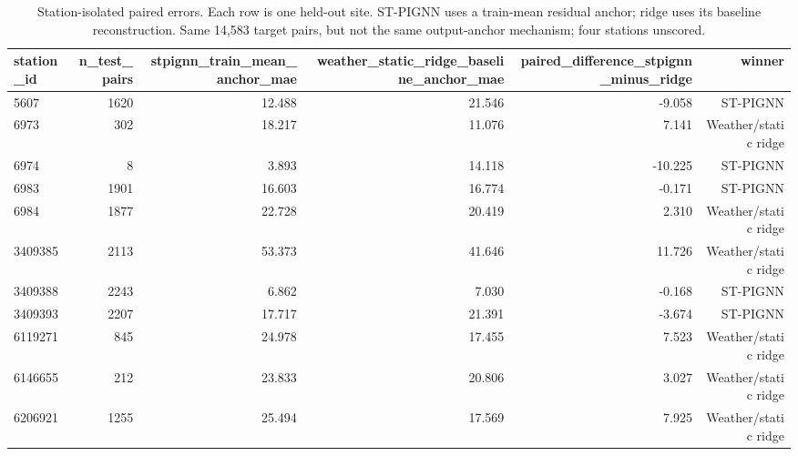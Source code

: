 \begin{table}[t]
\centering
\scriptsize
\caption{Station-isolated paired errors. Each row is one held-out site. ST-PIGNN uses a train-mean residual anchor; ridge uses its baseline reconstruction. Same 14,583 target pairs, but not the same output-anchor mechanism; four stations unscored.}
\label{tab:t04a_station_isolated_sites}
\begin{tabular}{lrrrrr}
\hline
station\_id & n\_test\_pairs & stpignn\_train\_mean\_anchor\_mae & weather\_static\_ridge\_baseline\_anchor\_mae & paired\_difference\_stpignn\_minus\_ridge & winner \\
\hline
5607 & 1620 & 12.488 & 21.546 & -9.058 & ST-PIGNN \\
6973 & 302 & 18.217 & 11.076 & 7.141 & Weather/static ridge \\
6974 & 8 & 3.893 & 14.118 & -10.225 & ST-PIGNN \\
6983 & 1901 & 16.603 & 16.774 & -0.171 & ST-PIGNN \\
6984 & 1877 & 22.728 & 20.419 & 2.310 & Weather/static ridge \\
3409385 & 2113 & 53.373 & 41.646 & 11.726 & Weather/static ridge \\
3409388 & 2243 & 6.862 & 7.030 & -0.168 & ST-PIGNN \\
3409393 & 2207 & 17.717 & 21.391 & -3.674 & ST-PIGNN \\
6119271 & 845 & 24.978 & 17.455 & 7.523 & Weather/static ridge \\
6146655 & 212 & 23.833 & 20.806 & 3.027 & Weather/static ridge \\
6206921 & 1255 & 25.494 & 17.569 & 7.925 & Weather/static ridge \\
\hline
\end{tabular}
\end{table}
